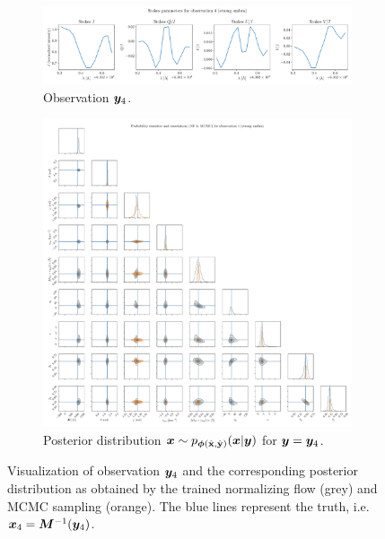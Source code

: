 \documentclass[a4paper,12pt]{report}
\begin{document}
\begin{figure}[h!]
	\centering
	\begin{subfigure}[t]{\textwidth}
	\centering
	\includegraphics[width=\textwidth]{figures/nf-milne-eddington-example-6-corner-spectrum-4-nf-nflows-piecewisequadratic.pdf}
    \caption{Observation $\bm{y}_4$.}
	\end{subfigure}
	\begin{subfigure}[t]{\textwidth}
	\centering
	\includegraphics[width=\textwidth]{figures/nf-milne-eddington-example-6-corner-4-nf-mcmc-nflows-piecewisequadratic.pdf}
    \caption{Posterior distribution $\bm{x}\sim p_{\bm{\phi}(\hat{\boldsymbol{\mathbf{x}}},\hat{\boldsymbol{\mathbf{y}}})}(\bm{x}|\bm{y})$ for $\bm{y} = \bm{y}_4$.}
	\end{subfigure}
\cprotect\caption{Visualization of observation $\bm{y}_4$ and the corresponding posterior distribution as obtained by the trained normalizing flow (grey) and MCMC sampling (orange). The blue lines represent the truth, i.e. $\bm{x}_4 = \bm{M}^{-1}(\bm{y}_4)$.}
\label{fig:nf-milne-eddington-example-6-corner-4-nf-piecewisequadratic-results}
\end{figure}
\end{document}
